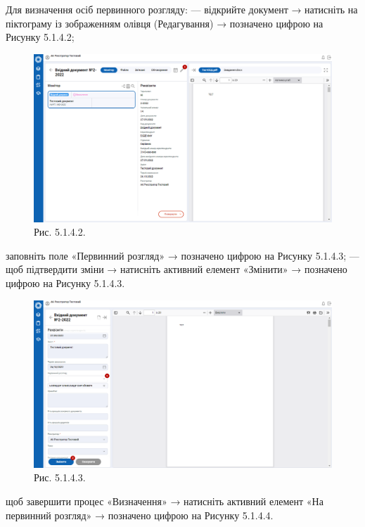 Для визначення осіб первинного розгляду:
--- відкрийте документ → натисніть на піктограму із зображенням олівця
(Редагування) → позначено цифрою  на Рисунку 5.1.4.2;

\begin{figure}[!htbp]
\centerline{\includegraphics[width=\textwidth]{img/5.1.4.2.png}}
\caption{Рис. 5.1.4.2. }
\end{figure}

заповніть поле «Первинний розгляд» → позначено цифрою  на Рисунку 5.1.4.3;
--- щоб підтвердити зміни → натисніть активний елемент «Змінити» → позначено цифрою  на Рисунку 5.1.4.3.

\begin{figure}[!htbp]
\centerline{\includegraphics[width=\textwidth]{img/5.1.4.3.png}}
\caption{Рис. 5.1.4.3. }
\end{figure}

щоб завершити процес «Визначення» → натисніть активний елемент «На
первинний розгляд» → позначено цифрою  на Рисунку 5.1.4.4.

